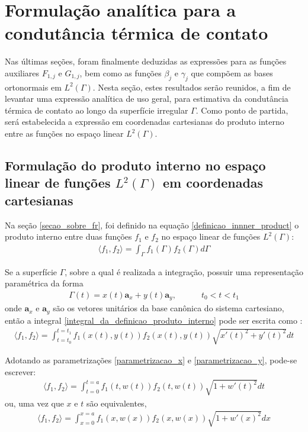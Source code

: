 \section{Formulação analítica para a condutância térmica de contato}

Nas últimas seções, foram finalmente deduzidas as expressões para as funções auxiliares $F_{1,j}$ e $G_{1,j}$, bem como as funções $\beta_j$ e $\gamma_j$ que compõem as bases ortonormais em $L^2(\Gamma)$. Nesta seção, estes resultados serão reunidos, a fim de levantar uma expressão analítica de uso geral, para estimativa da condutância térmica de contato ao longo da superfície irregular $\Gamma$. Como ponto de partida, será estabelecida a expressão em coordenadas cartesianas do produto interno entre as funções no espaço linear $L^2(\Gamma)$.

\subsection{Formulação do produto interno no espaço linear de funções $L^2(\Gamma)$ em coordenadas cartesianas}

Na seção \ref{secao_sobre_fr}, foi definido na equação \eqref{definicao_innner_product} o produto interno entre duas funções $f_1$ e $f_2$ no espaço linear de funções $L^2(\Gamma)$:
\begin{align}
\langle f_1, f_2\rangle = \int_\Gamma f_1(\Gamma) f_2(\Gamma) d\Gamma \label{integral_da_definicao_produto_interno}
\end{align}

Se a superfície $\Gamma$, sobre a qual é realizada a integração, possuir uma representação paramétrica da forma
\begin{align}
\Gamma(t) = x(t)\mathbf{a}_x + y(t)\mathbf{a}_y, \quad\quad\quad t_0 < t < t_1
\end{align}
onde $\mathbf{a}_x$ e $\mathbf{a}_y$ são os vetores unitários da base canônica do sistema cartesiano, então a integral \eqref{integral_da_definicao_produto_interno} pode ser escrita como \citep{livro_stewart}:
\begin{align}
\langle f_1, f_2\rangle = \int_{t=t_0}^{t=t_1}f_1(x(t), y(t))f_2(x(t), y(t))\sqrt{x'(t)^2 + y'(t)^2}dt \label{integral_da_definicao_produto_interno_2}
\end{align}

Adotando as parametrizações \eqref{parametrizacao_x} e \eqref{parametrizacao_y}, pode-se escrever:
\begin{align} 
\langle f_1, f_2\rangle = \int_{t=0}^{t=a}f_1(t, w(t))f_2(t, w(t))\sqrt{1 + w'(t)^2}dt \label{integral_da_definicao_produto_interno_3}
\end{align}
ou, uma vez que $x$ e $t$ são equivalentes,
\begin{align}
\langle f_1, f_2\rangle = \int_{x=0}^{x=a}f_1(x, w(x))f_2(x, w(x))\sqrt{1 + w'(x)^2}dx \label{integral_da_definicao_produto_interno_4}
\end{align}

